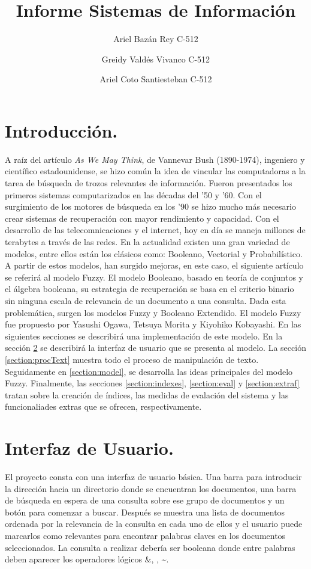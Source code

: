 \documentclass[]{article}
\title{\huge Informe Sistemas de Información}
\author{Ariel Bazán Rey C-512 \and Greidy Valdés Vivanco C-512\and Ariel Coto Santiesteban C-512}
\date{}
\begin{document}
\maketitle

\section{Introducción.}
A raíz del artículo \emph{As We May Think}, de Vannevar Bush (1890-1974), ingeniero y científico estadounidense, se hizo común la idea de vincular las computadoras a la tarea de búsqueda de trozos relevantes de información. Fueron presentados los primeros sistemas computarizados en las décadas del '50 y '60. Con el surgimiento de los motores de búsqueda en los '90 se hizo mucho más necesario crear sistemas de recuperación con mayor rendimiento y capacidad. Con el desarrollo de las telecomnicaciones y el internet, hoy en día se maneja millones de terabytes a través de las redes. En la actualidad existen una gran variedad de modelos, entre ellos están los clásicos como: Booleano, Vectorial y Probabilístico. A partir de estos modelos, han surgido mejoras, en este caso, el siguiente artículo se referirá al modelo Fuzzy. El modelo Booleano, basado en teoría de  conjuntos y el álgebra booleana, su estrategia de recuperación se basa en el criterio binario sin ninguna escala de relevancia de un documento a una consulta. Dada esta problemática, surgen los modelos Fuzzy y Booleano Extendido.
El modelo Fuzzy fue propuesto por Yasushi Ogawa, Tetsuya Morita y Kiyohiko Kobayashi. En las siguientes secciones se describirá una implementación de este modelo. En la sección \ref{section:UI} se describirá la interfaz de usuario que se presenta al modelo. La sección \ref{section:procText} muestra todo el proceso de manipulación de texto. Seguidamente en \ref{section:model}, se desarrolla las ideas principales del modelo Fuzzy. Finalmente, las secciones \ref{section:indexes}, \ref{section:eval} y \ref{section:extraf} tratan sobre la creación de índices, las medidas de evalación del sistema y las funcionaliades extras que se ofrecen, respectivamente.

\section{Interfaz de Usuario.}
\label{section:UI}

El proyecto consta con una interfaz de usuario básica. Una barra para introducir la dirección hacia un directorio donde se encuentran los documentos, una barra de búsqueda en espera de una consulta sobre ese grupo de documentos y un botón para comenzar a buscar. Después se muestra una lista de documentos ordenada por la relevancia de la consulta en cada uno de ellos y el usuario puede marcarlos como relevantes para encontrar palabras claves en los documentos seleccionados. La consulta a realizar debería ser booleana donde entre palabras deben aparecer los operadores lógicos \&, \textbar{}, \textasciitilde{}. 
\end{document}
